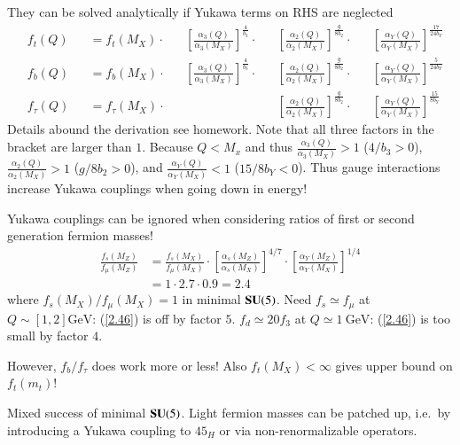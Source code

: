 They can be solved analytically if Yukawa terms on RHS are neglected
\begin{subequations}
   \label{2.44}
\begin{alignat}{5}
   & f_t(Q) &&= f_t(M_X) \cdot  &&\left[ \frac{\alpha_3 (Q)}{ \alpha_3 (M_X)} \right]^{\frac{4}{b_3}} \cdot &&\left[ \frac{\alpha_2 (Q)}{\alpha_2 (M_X)} \right]^{\frac{g}{8b_2}} \cdot &&\left[ \frac{\alpha_Y (Q)}{\alpha_Y(M_X)} \right]^{\frac{17}{24b_Y}} \label{2.44a}\\
   &f_b(Q) &&= f_b(M_X) \cdot &&\left[ \frac{\alpha_3 (Q)}{\alpha_3 (M_X)} \right]^{\frac{4}{b_3}} \cdot &&\left[ \frac{\alpha_2 (Q)}{\alpha_2(M_X)} \right]^{\frac{g}{8b_2}} \cdot &&\left[ \frac{\alpha_Y (Q)}{\alpha_Y (M_X)} \right]^{\frac{5}{24 b_Y}} \label{2.44b}\\
   &f_\tau (Q) &&= f_\tau (M_X) \cdot &&  && \left[ \frac{\alpha_2(Q)}{\alpha_2(M_X)} \right]^{\frac{g}{8b_2}} \cdot && \left[ \frac{\alpha_Y (Q)}{\alpha_Y(M_X)} \right]^{\frac{15}{8b_Y}} \label{2.44c}
\end{alignat}
\end{subequations}
Details abound the derivation see homework. Note that all three factors in the bracket are larger than $1$. Because $Q < M_x$ and thus $\frac{\alpha_3(Q)}{\alpha_3(M_X)} > 1$ ($4/b_3 > 0$), $\frac{\alpha_2(Q)}{\alpha_2(M_X)} > 1$ ($g/8b_2 > 0$), and $\frac{\alpha_Y(Q)}{\alpha_Y(M_X)} < 1$ ($15/8b_Y < 0$). Thus gauge interactions increase Yukawa couplings when going down in energy!

Yukawa couplings can be ignored when considering ratios of first or second generation fermion masses!
\begin{align}
   \frac{f_s(M_Z)}{f_\mu(M_Z)} &= \frac{f_s(M_X)}{f_\mu (M_X)} \cdot \left[ \frac{\alpha_s(M_Z)}{\alpha_s(M_X)} \right]^{4/7} \cdot \left[ \frac{\alpha_Y(M_Z)}{\alpha_Y(M_X)} \right]^{1/4} \label{2.45}\\
                               &= 1 \cdot 2.7 \cdot 0.9 = 2.4 \label{2.46}
\end{align}
where $f_s(M_X) / f_\mu(M_X) = 1$ in minimal $\mathbf{SU}(5)$. Need $f_s \simeq f_\mu$ at $Q \sim [1,2] \si{\giga\eV}$: (\ref{2.46}) is off by factor $5$. $f_d \simeq 20 f_3$ at $Q \simeq \SI{1}{\giga \eV}$: (\ref{2.46}) is too small by factor $4$.

However, $f_b / f_\tau$ does work more or less! Also $f_t(M_X) < \infty$ gives upper bound on $f_t(m_t)$!

Mixed success of minimal $\mathbf{SU}(5)$. Light fermion masses can be patched up, i.e.~by introducing a Yukawa coupling to $45_H$ or via non-renormalizable operators.

